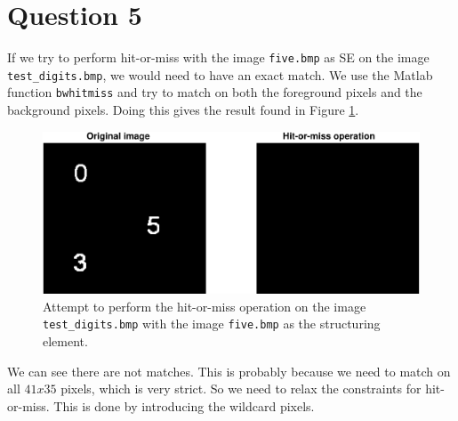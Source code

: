 \documentclass[a4paper]{article}
\begin{document}
\section*{Question 5}
If we try to perform hit-or-miss with the image \texttt{five.bmp} as SE on the image \texttt{test\_digits.bmp}, we would need to have an exact match. We use the Matlab function \texttt{bwhitmiss} and try to match on both the foreground pixels and the background pixels. Doing this gives the result found in Figure \ref{5a}.
\begin{figure}[H]
  \centering
  \captionsetup{justification=centering}
  \includegraphics[width=\textwidth]{q5a-crop.pdf}
  \caption{Attempt to perform the hit-or-miss operation on the image \texttt{test\_digits.bmp} with the image \texttt{five.bmp} as the structuring element.}
  \label{5a}
\end{figure}
We can see there are not matches. This is probably because we need to match on all $41x35$ pixels, which is very strict. So we need to relax the constraints for hit-or-miss. This is done by introducing the wildcard pixels.
\end{document}
